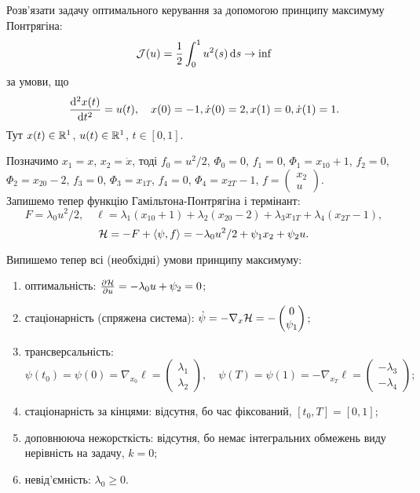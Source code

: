 \begin{problem}
	Розв'язати задачу оптимального керування за допомогою принципу максимуму Понтрягіна: \[ \mathcal{J} (u) = \frac{1}{2} \int_0^1 u^2 (s) \mathop{}\!\mathrm{d} s \to \inf \] за умови, що \[ \frac{\mathop{}\!\mathrm{d}^2 x(t)}{\mathop{}\!\mathrm{d} t^2} = u (t),\quad  x(0) = -1, \dot x(0) = 2, x(1) = 0, \dot x(1) = 1. \] Тут $x (t) \in \mathbb{R}^1$, $u (t) \in \mathbb{R}^1$, $t \in [0, 1]$.
\end{problem}

\begin{solution}
	Позначимо $x_1 = x$, $x_2 = \dot x$, тоді $f_0 = u^2 / 2$, $\Phi_0 = 0$, $f_1 = 0$, $\Phi_1 = x_{10} + 1$, $f_2 = 0$, $\Phi_2 = x_{20} - 2$, $f_3 = 0$, $\Phi_3 = x_{1T}$, $f_4 = 0$, $\Phi_4 = x_{2T} - 1$, $f = \begin{pmatrix} x_2 \\ u \end{pmatrix}$. \\

	Запишемо тепер функцію Гамільтона-Понтрягіна і термінант: \[ F = \lambda_0 u^2 / 2, \quad \ell = \lambda_1 (x_{10} + 1) + \lambda_2 (x_{20} - 2) + \lambda_3 x_{1T} + \lambda_4 (x_{2T} - 1), \] \[ \mathcal{H} = -F + \langle \psi, f \rangle = - \lambda_0 u^2 / 2 + \psi_1 x_2 + \psi_2 u. \]

	Випишемо тепер всі (необхідні) умови принципу максимуму:
	\begin{enumerate}
		\item оптимальність: $\frac{\partial \mathcal{H}}{\partial u} = - \lambda_0 u + \psi_2  = 0$;
		\item стаціонарність (спряжена система): $\dot \psi = - \nabla_x \mathcal{H} = - \begin{pmatrix} 0 \\ \psi_1 \end{pmatrix}$;
		\item трансверсальність: \[\psi(t_0) = \psi(0) = \nabla_{x_0} \ell = \begin{pmatrix} \lambda_1 \\ \lambda_2 \end{pmatrix}, \quad \psi(T) = \psi(1) = - \nabla_{x_T} \ell = \begin{pmatrix} - \lambda_3 \\ - \lambda_4 \end{pmatrix};\]
		\item стаціонарність за кінцями: відсутня, бо час фіксований, $[t_0,T]=[0,1]$;
		\item доповнююча нежорсткість: відсутня, бо немає інтегральних обмежень виду нерівність на задачу, $k = 0$;
		\item невід'ємність: $\lambda_0 \ge 0$.
	\end{enumerate}


\end{solution}
